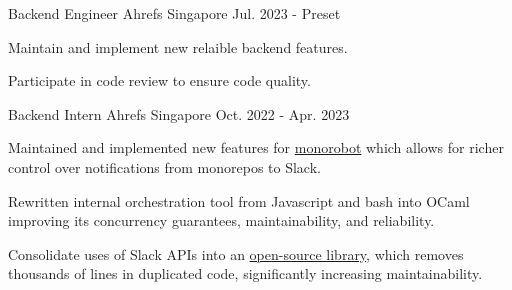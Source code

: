 

\begin{cventries}
  \cventry
    {Backend Engineer} %
    {Ahrefs} %
    {Singapore} %
    {Jul. 2023 - Preset} %
    {
      \begin{cvitems} %
        \item {Maintain and implement new relaible backend features.}
        \item {Participate in code review to ensure code quality.}
      \end{cvitems}
    }
  \cventry
    {Backend Intern} %
    {Ahrefs} %
    {Singapore} %
    {Oct. 2022 - Apr. 2023} %
    {
      \begin{cvitems} %
        \item {Maintained and implemented new features for \href{https://github.com/ahrefs/monorobot}{monorobot} which allows for richer control over notifications from monorepos to Slack.}
        \item {Rewritten internal orchestration tool from Javascript and bash into OCaml improving its concurrency guarantees, maintainability, and reliability.}
        \item {Consolidate uses of Slack APIs into an \href{https://github.com/ahrefs/slack}{open-source library}, which removes thousands of lines in duplicated code, significantly increasing maintainability.}
      \end{cvitems}
    }


\end{cventries}
